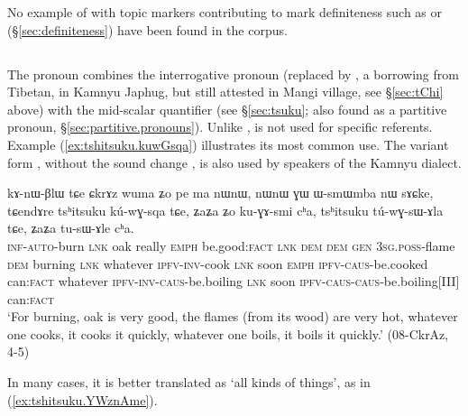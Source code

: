 No example of  with topic markers contributing to mark definiteness such as  or  (§\ref{sec:definiteness}) have been found in the corpus.

\subsection{} \label{sec:tshitsuku}
The pronoun  combines the  interrogative pronoun  (replaced by , a borrowing from Tibetan, in Kamnyu Japhug, but still attested in Mangi village, see §\ref{sec:tChi} above) with the mid-scalar quantifier   (see §\ref{sec:tsuku}; also found as a partitive pronoun, §\ref{sec:partitive.pronouns}).  Unlike  , is not used for specific referents.  Example (\ref{ex:tshitsuku.kuwGsqa}) illustrates its most common use. The variant form , without the sound change  \fl{} , is also used by speakers of the Kamnyu dialect.

\begin{exe}
\ex \label{ex:tshitsuku.kuwGsqa}
\gll  
kɤ-nɯ-βlɯ tɕe ɕkrɤz wuma ʑo pe ma nɯnɯ, nɯnɯ ɣɯ ɯ-smɯmba nɯ sɤɕke, tɕendɤre tsʰitsuku kú-wɣ-sqa tɕe, ʑaʑa ʑo ku-ɣɤ-smi cʰa, tsʰitsuku tú-wɣ-sɯ-ɤla tɕe, ʑaʑa tu-sɯ-ɤle cʰa. \\
\textsc{inf}-\textsc{auto}-burn \textsc{lnk} oak really \textsc{emph} be.good:\textsc{fact} \textsc{lnk} \textsc{dem} \textsc{dem} \textsc{gen} \textsc{3sg}.\textsc{poss}-flame \textsc{dem} burning \textsc{lnk} whatever \textsc{ipfv}-\textsc{inv}-cook \textsc{lnk} soon \textsc{emph}  \textsc{ipfv}-\textsc{caus}-be.cooked can:\textsc{fact} whatever \textsc{ipfv}-\textsc{inv}-\textsc{caus}-be.boiling \textsc{lnk} soon  \textsc{ipfv}-\textsc{caus}-\textsc{caus}-be.boiling[III] can:\textsc{fact} \\
\glt `For burning, oak is very good, the flames (from its wood) are very hot, whatever one cooks, it cooks it quickly, whatever one boils, it boils it quickly.' (08-CkrAz, 4-5)
\end{exe}
 
In many cases, it is better translated as `all kinds of things', as in (\ref{ex:tshitsuku.YWznAme}).

